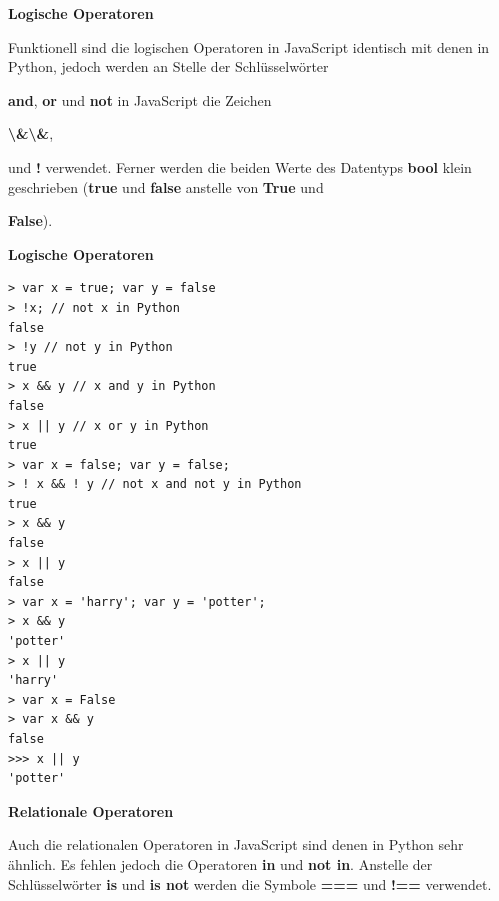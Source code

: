 \vspace{0.5cm}\par\noindent\textbf{Logische Operatoren}\vspace{0.5cm}

Funktionell sind die logischen Operatoren in JavaScript identisch mit
denen in Python, jedoch werden an Stelle der Schlüsselwörter
\vspace{0.5cm}\par\noindent\textbf{and}, \textbf{or} und \textbf{not} in JavaScript die Zeichen\vspace{0.5cm}
\vspace{0.5cm}\par\noindent\textbf{\textbackslash{}\&\textbackslash{}\&},\vspace{0.5cm}
\vspace{0.5cm}\par\noindent\textbf{\textbar{}\textbar{}} und \textbf{!} verwendet. Ferner werden\vspace{0.5cm}
die beiden Werte des Datentyps \textbf{bool} klein geschrieben
(\textbf{true} und \textbf{false} anstelle von \textbf{True} und
\vspace{0.5cm}\par\noindent\textbf{False}).\vspace{0.5cm}




\vspace{0.5cm}\par\noindent\textbf{Logische Operatoren}\vspace{0.5cm}

\begin{verbatim}
> var x = true; var y = false
> !x; // not x in Python
false
> !y // not y in Python
true
> x && y // x and y in Python
false
> x || y // x or y in Python
true
> var x = false; var y = false;
> ! x && ! y // not x and not y in Python
true
> x && y
false
> x || y
false
> var x = 'harry'; var y = 'potter';
> x && y
'potter'
> x || y
'harry'
> var x = False
> var x && y
false
>>> x || y
'potter'
\end{verbatim}




\vspace{0.5cm}\par\noindent\textbf{Relationale Operatoren}\vspace{0.5cm}

Auch die relationalen Operatoren in JavaScript sind denen in Python sehr
ähnlich. Es fehlen jedoch die Operatoren \textbf{in} und \textbf{not
in}. Anstelle der Schlüsselwörter \textbf{is} und \textbf{is not} werden
die Symbole \textbf{===} und \textbf{!==} verwendet.




